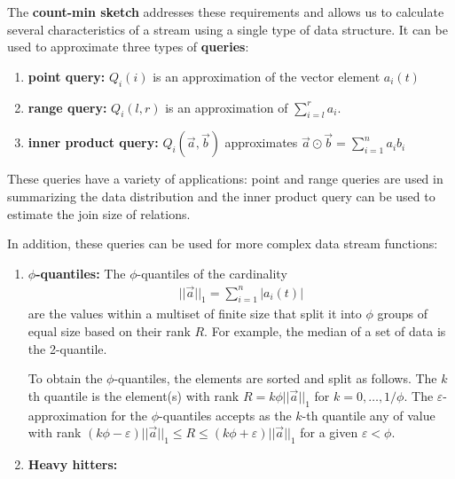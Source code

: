 \documentclass[11pt]{article}
\newcommand{\sq}{\mathit{Q}_i}
\begin{document}
The \textbf{count-min sketch} addresses these requirements and allows us to calculate several characteristics
of a stream using a single type of data structure.  It can be used to approximate three types of \textbf{queries}:
\begin{enumerate}
    \item \textbf{point query:} $\sq(i)$ is an approximation of the vector 
    element $a_i(t)$
    \item \textbf{range query:} $\sq(l, r)$ is an approximation of 
    $\sum_{i = l}^{r}a_i$. 
    \item \textbf{inner product query:} $\sq(\vec{a}, \vec{b})$ approximates
    $\vec{a} \odot \vec{b} = \sum_{i = 1}^{n} a_i b_i$
\end{enumerate}

These queries have a variety of applications: point and range queries are used in summarizing
the data distribution and the inner product query can be used to estimate the join size of 
relations. 

In addition, these queries can be used for more complex data stream functions:

\begin{enumerate}
    \item \textbf{$\phi$-quantiles:} The $\phi$-quantiles of the cardinality
    \begin{align}
        ||\vec{a}||_1 = \sum_{i = 1}^{n}|a_i(t)|
    \end{align}
    are the values within a multiset of finite size that split it 
    into $\phi$ groups of equal size based on their rank $R$.  For example, the
    median of a set of data is the 2-quantile. 
    
    To obtain the $\phi$-quantiles, the elements are sorted and split as
    follows.  The $k$th quantile is the element(s) with rank $R =
    k\phi||\vec{a}||_1$ for $k = 0, \dots, 1/\phi$.  The
    $\varepsilon$-approximation for the $\phi$-quantiles accepts as the $k$-th
    quantile any of value with rank $(k\phi - \varepsilon)||\vec{a}||_1 \leq R
    \leq (k\phi + \varepsilon)||\vec{a}||_1$ for a given $\varepsilon < \phi$.
    \item \textbf{Heavy hitters:}
\end{enumerate}
\end{document}
